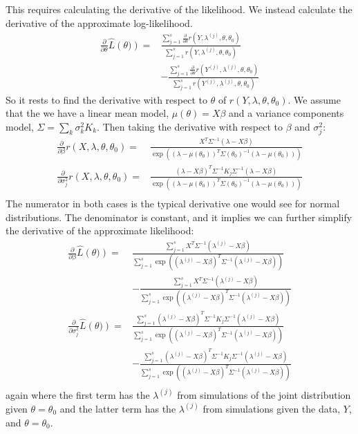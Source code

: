 \documentclass{acm_proc_article-sp}
\begin{document}
This requires calculating the derivative of the likelihood.  We instead calculate the derivative of the approximate log-likelihood.
\begin{align*}
\frac{\partial}{\partial \theta} \hat{L} \left( \theta) \right) =& \frac{\sum_{j=1}^s \frac{\partial}{\partial \theta} r \left( Y , \lambda^{(j)} , \theta, \theta_0 \right) }{\sum_{j=1}^s r \left( Y , \lambda^{(j)} , \theta, \theta_0 \right) } \\
&-\frac{\sum_{j=1}^s \frac{\partial}{\partial \theta} r \left( Y^{(j)} , \lambda^{(j)} , \theta, \theta_0 \right) }{\sum_{j=1}^s r \left( Y^{(j)} , \lambda^{(j)} , \theta, \theta_0 \right) }
\end{align*}
So it rests to find the derivative with respect to $\theta$ of $r(Y,\lambda, \theta, \theta_0)$.  We assume that the we have a linear mean model, $\mu(\theta) = X \beta$ and a variance components model, $\Sigma = \sum_k \sigma_k^2 K_k$.  Then taking the derivative with respect to $\beta$ and $\sigma_j^2$:
\begin{align*}
\frac{\partial}{\partial \beta} r(X,\lambda, \theta, \theta_0) =& \frac{X^T \Sigma^{-1} \left( \lambda  - X \beta \right) }{\exp \left( (\lambda - \mu(\theta_0))^T \Sigma(\theta_0)^{-1} (\lambda - \mu(\theta_0) ) \right)} \\
\frac{\partial}{\partial \sigma^2_j} r(X,\lambda, \theta, \theta_0) =& \frac{(\lambda - X \beta)^T \Sigma^{-1} K_j \Sigma^{-1} \left( \lambda  - X \beta \right) }{\exp \left( (\lambda - \mu(\theta_0))^T \Sigma(\theta_0)^{-1} (\lambda - \mu(\theta_0) ) \right)} \\
\end{align*}
The numerator in both cases is the typical derivative one would see for normal distributions.  The denominator is constant, and it implies we can further simplify the derivative of the approximate likelihood:
\begin{align*}
\frac{\partial}{\partial \beta} \hat{L} \left( \theta) \right) =& \frac{\sum_{j=1}^s X^T \Sigma^{-1} \left( \lambda^{(j)}  - X \beta \right) }{\sum_{j=1}^s  \exp \left( (\lambda^{(j)} - X\beta)^T \Sigma^{-1} (\lambda^{(j)} - X\beta) \right)} \\
&- \frac{\sum_{j=1}^s X^T \Sigma^{-1} \left( \lambda^{(j)}  - X \beta \right) }{\sum_{j=1}^s  \exp \left( (\lambda^{(j)} - X\beta)^T \Sigma^{-1} (\lambda^{(j)} - X\beta) \right)} \\
\frac{\partial}{\partial \sigma^2_j} \hat{L} \left( \theta) \right) =& \frac{\sum_{j=1}^s (\lambda^{(j)} - X\beta)^T \Sigma^{-1} K_j \Sigma^{-1} \left( \lambda^{(j)}  - X \beta \right) }{\sum_{j=1}^s  \exp \left( (\lambda^{(j)} - X\beta)^T \Sigma^{-1} (\lambda^{(j)} - X\beta) \right)} \\
&- \frac{\sum_{j=1}^s (\lambda^{(j)} - X\beta)^T \Sigma^{-1} K_j \Sigma^{-1} \left( \lambda^{(j)}  - X \beta \right) }{\sum_{j=1}^s  \exp \left( (\lambda^{(j)} - X\beta)^T \Sigma^{-1} (\lambda^{(j)} - X\beta) \right)} \\
\end{align*}
again where the first term has the $\lambda^{(j)}$ from simulations of the joint distribution given $\theta = \theta_0$ and the latter term has the $\lambda^{(j)}$ from simulations given the data, $Y$, and $\theta = \theta_0$.
\end{document}
